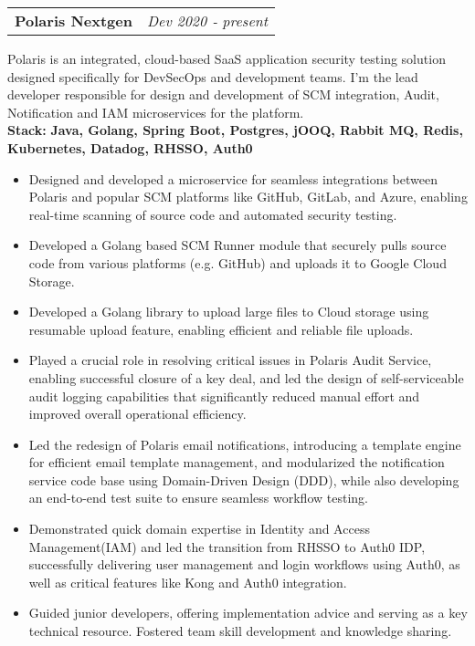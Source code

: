 \documentclass[14pt,a4paper,sans]{moderncv}
\newcommand{\project}[5]{
    \noindent
    \begin{tabularx}{\textwidth}{Xr}
    \textbf{#1} & \textit{#2} \\
    \end{tabularx}
    #3 \\ %
    \noindent\textbf{Stack:} \textbf{#4} %
    \begin{itemize}[label=\textbullet, left=1em] %
    #5 %
    \end{itemize}
    \vspace{1em} %
}
\begin{document}
    \project{Polaris Nextgen}{Dev 2020 ‐ present}
    {Polaris is an integrated, cloud-based SaaS application security testing solution designed specifically for DevSecOps and development teams.
    I'm the lead developer responsible for design and development of SCM integration, Audit, Notification and IAM microservices for the platform.}
    {Java, Golang, Spring Boot, Postgres, jOOQ, Rabbit MQ, Redis, Kubernetes, Datadog, RHSSO, Auth0}
    {
        \item Designed and developed a microservice for seamless integrations between Polaris and popular SCM platforms like GitHub, GitLab, and Azure, enabling real-time scanning of source code and automated security testing.
        \item Developed a Golang based SCM Runner module that securely pulls source code from various platforms (e.g. GitHub) and uploads it to Google Cloud Storage.
        \item Developed a Golang library to upload large files to Cloud storage  using resumable upload feature, enabling efficient and reliable file uploads.
        \item Played a crucial role in resolving critical issues in Polaris Audit Service, enabling successful closure of a key deal, and led the design of self-serviceable audit logging capabilities that significantly reduced manual effort and improved overall operational efficiency.
        \item Led the redesign of Polaris email notifications, introducing a template engine for efficient email template management, and modularized the notification service code base using Domain-Driven Design (DDD), while also developing an end-to-end test suite to ensure seamless workflow testing.
        \item Demonstrated quick domain expertise in Identity and Access Management(IAM) and led the transition from RHSSO to Auth0 IDP, successfully delivering user management and login workflows using Auth0, as well as critical features like Kong and Auth0 integration.
        \item Guided junior developers, offering implementation advice and serving as a key technical resource. Fostered team skill development and knowledge sharing.
    }

    \newpage
\end{document}
